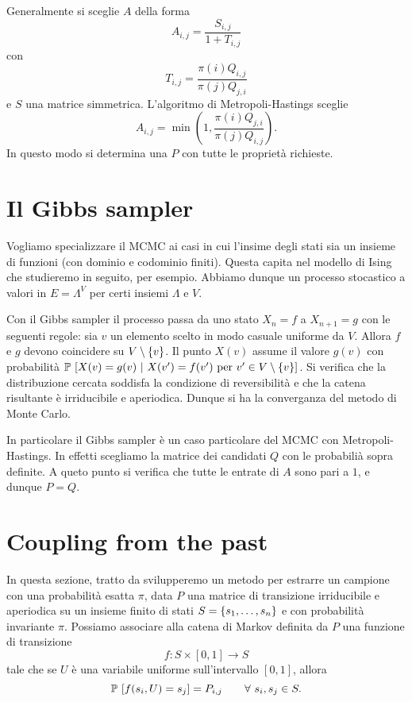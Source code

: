 \documentclass[]{marticle}
\begin{document}
Generalmente si sceglie $A$ della forma
\[
    A_{i,j} = \frac{S_{i,j}}{1+T_{i,j}}
\]
con
\[
    T_{i, j} = \frac{\pi(i) Q_{i,j}}{\pi(j) Q_{j,i}}
\]
e $S$ una matrice simmetrica.
L'algoritmo di Metropoli-Hastings sceglie
\[
    A_{i,j} = \min \left(1, \frac{\pi(i)Q_{j,i}}{\pi(j)Q_{i,j}}\right).
\]
 In questo modo si determina una $P$ con tutte le propriet\`a richieste.

\section{Il Gibbs sampler}

Vogliamo specializzare il MCMC ai casi in cui l'insime degli stati sia un
insieme di funzioni (con dominio e codominio finiti). Questa capita nel modello
di Ising che studieremo in seguito, per esempio. Abbiamo dunque un processo
stocastico a valori in $E=\Lambda^V$ per certi insiemi $\Lambda$ e $V$. 

Con il Gibbs sampler il processo passa da uno stato $X_n=f$ a $X_{n+1}=g$ con le
seguenti regole: sia $v$ un elemento scelto in modo casuale uniforme da $V$.
Allora $f$ e $g$ devono coincidere su $V\setminus\{v\}$. Il punto $X(v)$
assume il valore $g(v)$ con probabilit\`a $\prob{X(v)=g(v) \ |\ X(v')=f(v')
\text{ per } v' \in V\setminus\setof{v}}$. Si verifica che la distribuzione
cercata soddisfa la condizione di reversibilit\`a e che la catena risultante \`e
irriducibile e aperiodica. Dunque si ha la converganza del metodo di Monte
Carlo.

In particolare il Gibbs sampler \`e un caso particolare del MCMC con
Metropoli-Hastings. In effetti scegliamo la matrice dei candidati $Q$ con le
probabili\`a sopra definite. A queto punto si verifica che tutte le entrate di
$A$ sono pari a $1$, e dunque $P=Q$.

\section{Coupling from the past}

In questa sezione, tratto da \cite{haggstrom} svilupperemo un metodo per
estrarre un campione con una probabilit\`a esatta $\pi$, data $P$ una matrice di
transizione irriducibile e aperiodica su un insieme finito di stati
$S=\{s_1,\dots,s_n\}$ e con probabilit\`a invariante $\pi$. Possiamo
associare alla catena di Markov definita da $P$ una funzione di transizione 
\[
    f\colon S\times [0,1] \longrightarrow S
\]
tale che se $U$ \`e una variabile uniforme sull'intervallo $[0,1]$, allora 
\[
    \prob{f(s_i,U)=s_j}=P_{i,j} \qquad \forall s_i,s_j \in S.
\]
\end{document}
